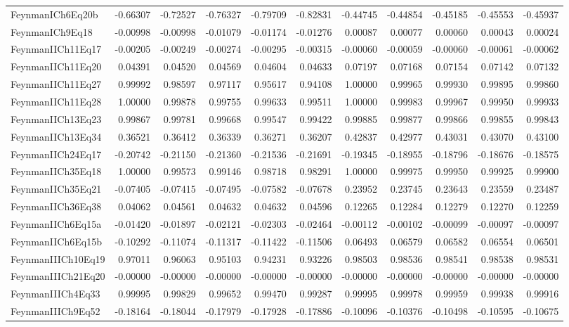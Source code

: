 \begin{tabular}{lrrrrrrrrrr}
FeynmanICh6Eq20b & -0.66307 & -0.72527 & -0.76327 & -0.79709 & -0.82831 & -0.44745 & -0.44854 & -0.45185 & -0.45553 & -0.45937 \\
FeynmanICh9Eq18 & -0.00998 & -0.00998 & -0.01079 & -0.01174 & -0.01276 & 0.00087 & 0.00077 & 0.00060 & 0.00043 & 0.00024 \\
FeynmanIICh11Eq17 & -0.00205 & -0.00249 & -0.00274 & -0.00295 & -0.00315 & -0.00060 & -0.00059 & -0.00060 & -0.00061 & -0.00062 \\
FeynmanIICh11Eq20 & 0.04391 & 0.04520 & 0.04569 & 0.04604 & 0.04633 & 0.07197 & 0.07168 & 0.07154 & 0.07142 & 0.07132 \\
FeynmanIICh11Eq27 & 0.99992 & 0.98597 & 0.97117 & 0.95617 & 0.94108 & 1.00000 & 0.99965 & 0.99930 & 0.99895 & 0.99860 \\
FeynmanIICh11Eq28 & 1.00000 & 0.99878 & 0.99755 & 0.99633 & 0.99511 & 1.00000 & 0.99983 & 0.99967 & 0.99950 & 0.99933 \\
FeynmanIICh13Eq23 & 0.99867 & 0.99781 & 0.99668 & 0.99547 & 0.99422 & 0.99885 & 0.99877 & 0.99866 & 0.99855 & 0.99843 \\
FeynmanIICh13Eq34 & 0.36521 & 0.36412 & 0.36339 & 0.36271 & 0.36207 & 0.42837 & 0.42977 & 0.43031 & 0.43070 & 0.43100 \\
FeynmanIICh24Eq17 & -0.20742 & -0.21150 & -0.21360 & -0.21536 & -0.21691 & -0.19345 & -0.18955 & -0.18796 & -0.18676 & -0.18575 \\
FeynmanIICh35Eq18 & 1.00000 & 0.99573 & 0.99146 & 0.98718 & 0.98291 & 1.00000 & 0.99975 & 0.99950 & 0.99925 & 0.99900 \\
FeynmanIICh35Eq21 & -0.07405 & -0.07415 & -0.07495 & -0.07582 & -0.07678 & 0.23952 & 0.23745 & 0.23643 & 0.23559 & 0.23487 \\
FeynmanIICh36Eq38 & 0.04062 & 0.04561 & 0.04632 & 0.04632 & 0.04596 & 0.12265 & 0.12284 & 0.12279 & 0.12270 & 0.12259 \\
FeynmanIICh6Eq15a & -0.01420 & -0.01897 & -0.02121 & -0.02303 & -0.02464 & -0.00112 & -0.00102 & -0.00099 & -0.00097 & -0.00097 \\
FeynmanIICh6Eq15b & -0.10292 & -0.11074 & -0.11317 & -0.11422 & -0.11506 & 0.06493 & 0.06579 & 0.06582 & 0.06554 & 0.06501 \\
FeynmanIIICh10Eq19 & 0.97011 & 0.96063 & 0.95103 & 0.94231 & 0.93226 & 0.98503 & 0.98536 & 0.98541 & 0.98538 & 0.98531 \\
FeynmanIIICh21Eq20 & -0.00000 & -0.00000 & -0.00000 & -0.00000 & -0.00000 & -0.00000 & -0.00000 & -0.00000 & -0.00000 & -0.00000 \\
FeynmanIIICh4Eq33 & 0.99995 & 0.99829 & 0.99652 & 0.99470 & 0.99287 & 0.99995 & 0.99978 & 0.99959 & 0.99938 & 0.99916 \\
FeynmanIIICh9Eq52 & -0.18164 & -0.18044 & -0.17979 & -0.17928 & -0.17886 & -0.10096 & -0.10376 & -0.10498 & -0.10595 & -0.10675 \\
\bottomrule
\end{tabular}
